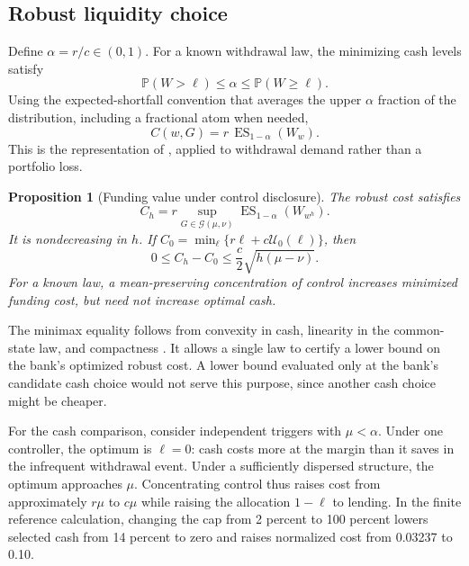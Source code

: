 \documentclass[11pt]{article}
\newtheorem{proposition}[theorem]{Proposition}
\theoremstyle{definition}\newtheorem{definition}[theorem]{Definition}
\newcommand{\Pp}{\mathbb P}
\newcommand{\G}{\mathcal G}
\newcommand{\U}{\mathcal U}
\newcommand{\ES}{\operatorname{ES}}
\begin{document}
\subsection{Robust liquidity choice}
Define \(\alpha=r/c\in(0,1)\). For a known withdrawal law, the minimizing cash levels satisfy
\begin{equation}
 \Pp(W>\ell)\leq\alpha\leq\Pp(W\geq\ell).
 \label{eq:quantile}
\end{equation}
Using the expected-shortfall convention that averages the upper \(\alpha\) fraction of the distribution, including a fractional atom when needed,
\begin{equation}
 C(w,G)=r\,\ES_{1-\alpha}(W_w).
 \label{eq:ES}
\end{equation}
This is the representation of \citet{rockafellar2002}, applied to withdrawal demand rather than a portfolio loss.

\begin{proposition}[Funding value under control disclosure]\label{prop:choice}
The robust cost satisfies
\begin{equation}
 C_h=r\sup_{G\in\G(\mu,\nu)}\ES_{1-\alpha}(W_{w^h}).
 \label{eq:robustES}
\end{equation}
It is nondecreasing in \(h\). If \(C_0=\min_\ell\{r\ell+c\U_0(\ell)\}\), then
\begin{equation}
 0\leq C_h-C_0\leq\frac{c}{2}\sqrt{h(\mu-\nu)}.
 \label{eq:costfloor}
\end{equation}
For a known law, a mean-preserving concentration of control increases minimized funding cost, but need not increase optimal cash.
\end{proposition}
The minimax equality follows from convexity in cash, linearity in the common-state law, and compactness \citep{sion1958}. It allows a single law to certify a lower bound on the bank's optimized robust cost. A lower bound evaluated only at the bank's candidate cash choice would not serve this purpose, since another cash choice might be cheaper.

For the cash comparison, consider independent triggers with \(\mu<\alpha\). Under one controller, the optimum is \(\ell=0\): cash costs more at the margin than it saves in the infrequent withdrawal event. Under a sufficiently dispersed structure, the optimum approaches \(\mu\). Concentrating control thus raises cost from approximately \(r\mu\) to \(c\mu\) while raising the allocation \(1-\ell\) to lending. In the finite reference calculation, changing the cap from 2 percent to 100 percent lowers selected cash from 14 percent to zero and raises normalized cost from 0.03237 to 0.10.
\end{document}
